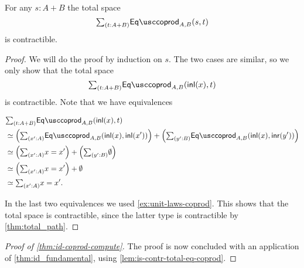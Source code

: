 \begin{lem}\label{lem:is-contr-total-eq-coprod}
For any $s:A+B$ the total space
\begin{equation*}
\sm{t:A+B}\Eqcoprod_{A,B}(s,t)
\end{equation*}
is contractible.
\end{lem}

\begin{proof}
We will do the proof by induction on $s$. The two cases are similar, so we only show that the total space
\begin{equation*}
\sm{t:A+B}\Eqcoprod_{A,B}(\inl(x),t)
\end{equation*}
is contractible. Note that we have equivalences
\begin{samepage}
\begin{align*}
& \sm{t:A+B}\Eqcoprod_{A,B}(\inl(x),t) \\
& \eqvsym \Big(\sm{x':A}\Eqcoprod_{A,B}(\inl(x),\inl(x'))\Big)+\Big(\sm{y':B}\Eqcoprod_{A,B}(\inl(x),\inr(y'))\Big) \\
& \eqvsym \Big(\sm{x':A}x=x'\Big)+\Big(\sm{y':B}\emptyt\Big) \\
& \eqvsym \Big(\sm{x':A}x=x'\Big)+\emptyt \\
& \eqvsym \sm{x':A}x=x'.
\end{align*}%
\end{samepage}%
In the last two equivalences we used \cref{ex:unit-laws-coprod}. This shows that the total space is contractible, since the latter type is contractible by \cref{thm:total_path}.
\end{proof}

\begin{proof}[Proof of \cref{thm:id-coprod-compute}]
The proof is now concluded with an application of \cref{thm:id_fundamental}, using \cref{lem:is-contr-total-eq-coprod}.
\end{proof}

